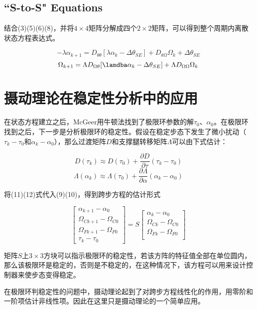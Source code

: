 \documentclass[UTF8]{ctexart}
\begin{document}
\subsection{``S-to-S" Equations}
结合(3)(5)(6)(8)，并将$4\times4$矩阵分解成四个$2\times2$矩阵，可以得到整个周期内离散状态方程表达式。\par
\begin{equation}
-\lambda\alpha_{k+1}=D_{\theta\theta}[\lambda\alpha_{k}-\Delta\theta_{SE}]+D_{\theta\Omega}\Omega_{k}+\Delta\theta_{SE}
\end{equation}
\begin{equation}
\Omega_{k+1}=\Lambda D_{\Omega\theta}[\lamdba\alpha_{k}-\Delta\theta_{SE}]+\Lambda D_{\Omega\Omega}\Omega_{k}
\end{equation}
\section{摄动理论在稳定性分析中的应用}
在状态方程建立之后，McGeer用牛顿法找到了极限环参数的解$\tau_{0}$、$\alpha_{0}$。在极限环找到之后，下一步是分析极限环的稳定性。假设在稳定步态下发生了微小扰动（$\tau_{k}-\tau_{0}$和$\alpha_{k}-\alpha_{0}$），那么过渡矩阵$D$和支撑腿转移矩阵$\Lambda$可以由下式估计：\par
\begin{equation}
D(\tau_{k})\approx D(\tau_{0})+\frac{\partial D}{\partial\tau}(\tau_{k}-\tau_{0})
\end{equation}
\begin{equation}
\Lambda(\alpha_{k})\approx\Lambda(\tau_{0})+\frac{\partial\Lambda}{\partial\alpha}(\alpha_{k}-\alpha_{0})
\end{equation}
\par
将(11)(12)式代入(9)(10)，得到跨步方程的估计形式\par
\begin{equation}
\left[
\begin{array}{c}
\alpha_{k+1}-\alpha_{0}\\
\Omega_{Ck+1}-\Omega_{C0}\\
\Omega_{Fk+1}-\Omega_{F0}\\
\tau_{k}-\tau_{0}
\end{array}
\right]
=S
\left[
\begin{array}{c}
\alpha_{k}-\alpha_{0}\\
\Omega_{Ck}-\Omega_{C0}\\
\Omega_{Fk}-\Omega_{F0}\\
\end{array}
\right]
\end{equation}
\par
矩阵$S$上$3\times3$方块可以指示极限环的稳定性，若该方阵的特征值全部在单位圆内，那么该极限环是稳定的，否则是不稳定的，在这种情况下，该方程可以用来设计控制器来使步态变得稳定。\par
在极限环判稳定性的问题中，摄动理论起到了对跨步方程线性化的作用，用零阶和一阶项估计非线性项。因此在这里只是摄动理论的一个简单应用。
\end{document}
